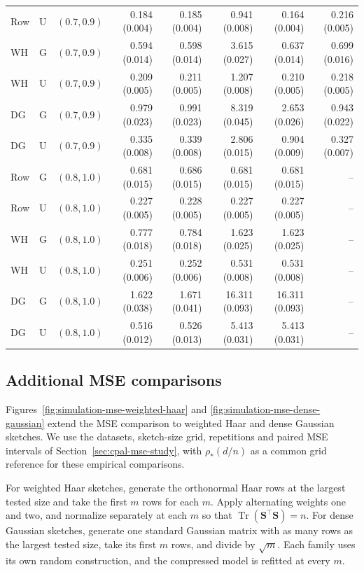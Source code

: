 \documentclass{article}
\theoremstyle{plain}
\theoremstyle{definition}
\theoremstyle{definition}
\DeclareMathOperator{\trace}{Tr}
\def\mathbold{\boldsymbol}
\def\bS{\mathbold{S}}\def\hbS{{\widehat{\bS}}}\def\tbS{{\widetilde{\bS}}}
\begin{document}
\begin{table}[tb]
\begin{tabular}{@{}lllrrrrr@{}}
Row & U & $(0.7,0.9)$ & 0.184 (0.004) & 0.185 (0.004) & 0.941 (0.008) & 0.164 (0.004) & 0.216 (0.005) \\
WH & G & $(0.7,0.9)$ & 0.594 (0.014) & 0.598 (0.014) & 3.615 (0.027) & 0.637 (0.014) & 0.699 (0.016) \\
WH & U & $(0.7,0.9)$ & 0.209 (0.005) & 0.211 (0.005) & 1.207 (0.008) & 0.210 (0.005) & 0.218 (0.005) \\
DG & G & $(0.7,0.9)$ & 0.979 (0.023) & 0.991 (0.023) & 8.319 (0.045) & 2.653 (0.026) & 0.943 (0.022) \\
DG & U & $(0.7,0.9)$ & 0.335 (0.008) & 0.339 (0.008) & 2.806 (0.015) & 0.904 (0.009) & 0.327 (0.007) \\
\midrule
Row & G & $(0.8,1.0)$ & 0.681 (0.015) & 0.686 (0.015) & 0.681 (0.015) & 0.681 (0.015) & -- \\
Row & U & $(0.8,1.0)$ & 0.227 (0.005) & 0.228 (0.005) & 0.227 (0.005) & 0.227 (0.005) & -- \\
WH & G & $(0.8,1.0)$ & 0.777 (0.018) & 0.784 (0.018) & 1.623 (0.025) & 1.623 (0.025) & -- \\
WH & U & $(0.8,1.0)$ & 0.251 (0.006) & 0.252 (0.006) & 0.531 (0.008) & 0.531 (0.008) & -- \\
DG & G & $(0.8,1.0)$ & 1.622 (0.038) & 1.671 (0.041) & 16.311 (0.093) & 16.311 (0.093) & -- \\
DG & U & $(0.8,1.0)$ & 0.516 (0.012) & 0.526 (0.013) & 5.413 (0.031) & 5.413 (0.031) & -- \\
\bottomrule
\end{tabular}




\end{table}

\FloatBarrier

\subsection{Additional MSE comparisons}
\label{sec:simulation-complementary-corrected}
\label{sec:simulation-mse-threshold}
\label{app:simulation-mse-sketch-families}
Figures~\ref{fig:simulation-mse-weighted-haar} and
\ref{fig:simulation-mse-dense-gaussian} extend the MSE comparison to
weighted Haar and dense Gaussian sketches. We use the datasets,
sketch-size grid, repetitions and paired MSE intervals of
Section~\ref{sec:cpal-mse-study}, with $\rho_*(d/n)$ as a common grid
reference for these empirical comparisons.

For weighted Haar sketches, generate the orthonormal Haar rows at the
largest tested size and take the first $m$ rows for each $m$.
Apply alternating weights one and two, and normalize separately at each
$m$ so that $\trace(\bS^\top\bS)=n$.
For dense Gaussian sketches, generate one standard Gaussian matrix
with as many rows as the largest tested size, take its first $m$ rows,
and divide by $\sqrt m$. Each family uses its own random construction,
and the compressed model is refitted at every $m$.
\end{document}
